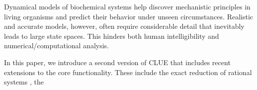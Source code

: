 
Dynamical models of biochemical systems help discover mechanistic principles in living organisms and predict their behavior under unseen circumstances.
Realistic and accurate models, however, often require considerable detail that inevitably leads to large state spaces.
This hinders both human intelligibility and numerical/computational analysis.



In this paper, we introduce a second version of CLUE that includes recent extensions to the core functionality. 
These include the exact reduction of rational systems \cite{jimenez_clue_2022}, the 


